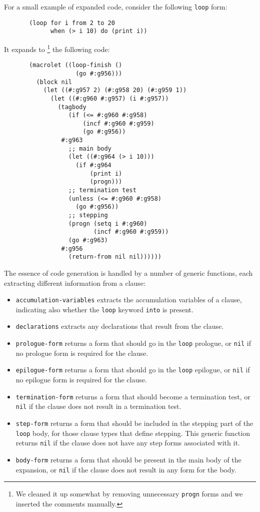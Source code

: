 \noindent
For a small example of expanded code, consider the following
\texttt{loop} form:

{\small\begin{verbatim}
       (loop for i from 2 to 20 
             when (> i 10) do (print i))
\end{verbatim}}

\noindent
It expands to%
\footnote{We cleaned it up somewhat by removing unnecessary
  \texttt{progn} forms and we inserted the comments manually.}
the following code:

{\small\begin{verbatim}
       (macrolet ((loop-finish ()
                    (go #:g956)))
         (block nil
           (let ((#:g957 2) (#:g958 20) (#:g959 1))
             (let ((#:g960 #:g957) (i #:g957))
               (tagbody
                  (if (<= #:g960 #:g958)
                      (incf #:g960 #:g959)
                      (go #:g956))
                #:g963
                  ;; main body
                  (let ((#:g964 (> i 10)))
                    (if #:g964
                        (print i)
                        (progn)))
                  ;; termination test
                  (unless (<= #:g960 #:g958)
                    (go #:g956))
                  ;; stepping
                  (progn (setq i #:g960) 
                         (incf #:g960 #:g959))
                  (go #:g963)
                #:g956
                  (return-from nil nil))))))
\end{verbatim}}

The essence of code generation is handled by a number of generic
functions, each extracting different information from a clause:

\begin{itemize}
\item \texttt{accumulation-variables} extracts the accumulation
  variables of a clause, indicating also whether the \texttt{loop}
  keyword \texttt{into} is present.
\item \texttt{declarations} extracts any declarations that result from
  the clause.
\item \texttt{prologue-form} returns a form that should go in the
  \texttt{loop} prologue, or \texttt{nil} if no prologue form is
  required for the clause.
\item \texttt{epilogue-form} returns a form that should go in the
  \texttt{loop} epilogue, or \texttt{nil} if no epilogue form is
  required for the clause.
\item \texttt{termination-form} returns a form that should become a
  termination test, or \texttt{nil} if the clause does not result in a
  termination test.
\item \texttt{step-form} returns a form that should be included in the
  stepping part of the \texttt{loop} body, for those clause types that
  define stepping.  This generic function returns \texttt{nil} if the
  clause does not have any step forms associated with it.
\item \texttt{body-form} returns a form that should be present in the
  main body of the expansion, or \texttt{nil} if the clause does not
  result in any form for the body.
\end{itemize}


